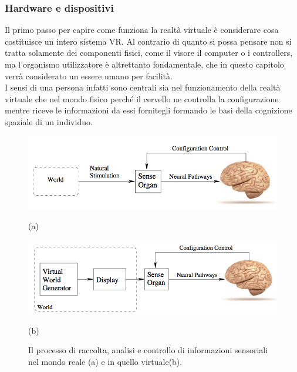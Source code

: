 \subsubsection{Hardware e dispositivi}
Il primo passo per capire come funziona la realtà virtuale è considerare cosa costituisce un intero sistema VR.
Al contrario di quanto si possa pensare non si tratta solamente dei componenti fisici, come il visore il computer o i controllers, ma l'organismo utilizzatore è altrettanto fondamentale, che in questo capitolo verrà considerato un essere umano per facilità.\\
I sensi di una persona infatti sono centrali sia nel funzionamento della realtà virtuale che nel mondo fisico perché il cervello ne controlla la configurazione mentre riceve le informazioni da essi fornitegli formando le basi della cognizione spaziale di un individuo.\\
\begin{figure}[h]
	\centering
	\begin{minipage}[b]{0.4\textwidth}
		\includegraphics[width=\textwidth]{figure/RealityBB}
		{\footnotesize \centerline{(a)} \par}
	\end{minipage}
	\hfill
	\begin{minipage}[b]{0.4\textwidth}
		\includegraphics[width=\textwidth]{figure/VRBB}
			{\footnotesize \centerline{(b)} \par}
	\end{minipage}
	\caption{Il processo di raccolta, analisi e controllo di informazioni sensoriali nel mondo reale (a) e in quello virtuale(b).}
\end{figure}



